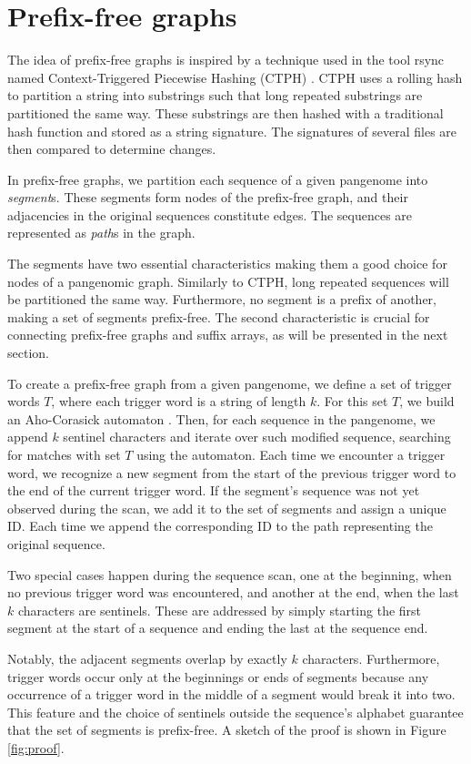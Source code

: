 \section{Prefix-free graphs}
The idea of prefix-free graphs is inspired by a technique used in the tool rsync named Context-Triggered Piecewise Hashing (CTPH) \cite{kornblum2006identifying}.
CTPH uses a rolling hash to partition a string into substrings such that long repeated substrings are partitioned the same way.
These substrings are then hashed with a traditional hash function and stored as a string signature.
The signatures of several files are then compared to determine changes.

In prefix-free graphs, we partition each sequence of a given pangenome into \emph{segment}s.
These segments form nodes of the prefix-free graph, and their adjacencies in the original sequences constitute edges.
The sequences are represented as \emph{path}s in the graph.

The segments have two essential characteristics making them a good choice for nodes of a pangenomic graph.
Similarly to CTPH, long repeated sequences will be partitioned the same way.
Furthermore, no segment is a prefix of another, making a set of segments prefix-free.
The second characteristic is crucial for connecting prefix-free graphs and suffix arrays, as will be presented in the next section.

To create a prefix-free graph from a given pangenome, we define a set of trigger words $T$, where each trigger word is a string of length $k$.
For this set $T$, we build an Aho-Corasick automaton \cite{aho1975efficient}.
Then, for each sequence in the pangenome, we append $k$ sentinel characters and iterate over such modified sequence, searching for matches with set $T$ using the automaton.
Each time we encounter a trigger word, we recognize a new segment from the start of the previous trigger word to the end of the current trigger word.
If the segment's sequence was not yet observed during the scan, we add it to the set of segments and assign a unique ID.
Each time we append the corresponding ID to the path representing the original sequence.

Two special cases happen during the sequence scan, one at the beginning, when no previous trigger word was encountered, and another at the end, when the last $k$ characters are sentinels.
These are addressed by simply starting the first segment at the start of a sequence and ending the last at the sequence end.

Notably, the adjacent segments overlap by exactly $k$ characters.
Furthermore, trigger words occur only at the beginnings or ends of segments because any occurrence of a trigger word in the middle of a segment would break it into two.
This feature and the choice of sentinels outside the sequence's alphabet guarantee that the set of segments is prefix-free.
A sketch of the proof is shown in Figure \ref{fig:proof}.

